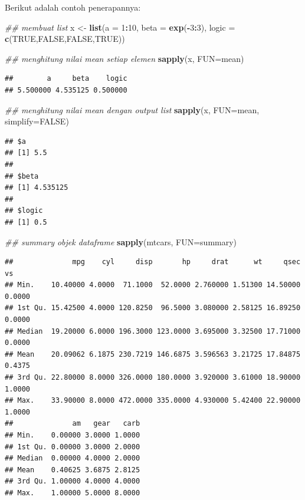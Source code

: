 \documentclass[]{book}
\newenvironment{Shaded}{\begin{snugshade}}{\end{snugshade}}
\newcommand{\CommentTok}[1]{\textcolor[rgb]{0.56,0.35,0.01}{\textit{#1}}}
\newcommand{\DataTypeTok}[1]{\textcolor[rgb]{0.13,0.29,0.53}{#1}}
\newcommand{\DecValTok}[1]{\textcolor[rgb]{0.00,0.00,0.81}{#1}}
\newcommand{\KeywordTok}[1]{\textcolor[rgb]{0.13,0.29,0.53}{\textbf{#1}}}
\newcommand{\NormalTok}[1]{#1}
\newcommand{\OperatorTok}[1]{\textcolor[rgb]{0.81,0.36,0.00}{\textbf{#1}}}
\newcommand{\OtherTok}[1]{\textcolor[rgb]{0.56,0.35,0.01}{#1}}
\newcommand{\StringTok}[1]{\textcolor[rgb]{0.31,0.60,0.02}{#1}}
\theoremstyle{definition}
\theoremstyle{definition}
\theoremstyle{definition}
\theoremstyle{remark}
\begin{document}
Berikut adalah contoh penerapannya:

\begin{Shaded}
\begin{Highlighting}[]
\CommentTok{## membuat list}
\NormalTok{x <-}\StringTok{ }\KeywordTok{list}\NormalTok{(}\DataTypeTok{a =} \DecValTok{1}\OperatorTok{:}\DecValTok{10}\NormalTok{, }\DataTypeTok{beta =} \KeywordTok{exp}\NormalTok{(}\OperatorTok{-}\DecValTok{3}\OperatorTok{:}\DecValTok{3}\NormalTok{), }\DataTypeTok{logic =} \KeywordTok{c}\NormalTok{(}\OtherTok{TRUE}\NormalTok{,}\OtherTok{FALSE}\NormalTok{,}\OtherTok{FALSE}\NormalTok{,}\OtherTok{TRUE}\NormalTok{))}

\CommentTok{## menghitung nilai mean setiap elemen}
\KeywordTok{sapply}\NormalTok{(x, }\DataTypeTok{FUN=}\NormalTok{mean)}
\end{Highlighting}
\end{Shaded}

\begin{verbatim}
##        a     beta    logic 
## 5.500000 4.535125 0.500000
\end{verbatim}

\begin{Shaded}
\begin{Highlighting}[]
\CommentTok{## menghitung nilai mean dengan output list}
\KeywordTok{sapply}\NormalTok{(x, }\DataTypeTok{FUN=}\NormalTok{mean, }\DataTypeTok{simplify=}\OtherTok{FALSE}\NormalTok{)}
\end{Highlighting}
\end{Shaded}

\begin{verbatim}
## $a
## [1] 5.5
## 
## $beta
## [1] 4.535125
## 
## $logic
## [1] 0.5
\end{verbatim}

\begin{Shaded}
\begin{Highlighting}[]
\CommentTok{## summary objek dataframe}
\KeywordTok{sapply}\NormalTok{(mtcars, }\DataTypeTok{FUN=}\NormalTok{summary)}
\end{Highlighting}
\end{Shaded}

\begin{verbatim}
##              mpg    cyl     disp       hp     drat      wt     qsec     vs
## Min.    10.40000 4.0000  71.1000  52.0000 2.760000 1.51300 14.50000 0.0000
## 1st Qu. 15.42500 4.0000 120.8250  96.5000 3.080000 2.58125 16.89250 0.0000
## Median  19.20000 6.0000 196.3000 123.0000 3.695000 3.32500 17.71000 0.0000
## Mean    20.09062 6.1875 230.7219 146.6875 3.596563 3.21725 17.84875 0.4375
## 3rd Qu. 22.80000 8.0000 326.0000 180.0000 3.920000 3.61000 18.90000 1.0000
## Max.    33.90000 8.0000 472.0000 335.0000 4.930000 5.42400 22.90000 1.0000
##              am   gear   carb
## Min.    0.00000 3.0000 1.0000
## 1st Qu. 0.00000 3.0000 2.0000
## Median  0.00000 4.0000 2.0000
## Mean    0.40625 3.6875 2.8125
## 3rd Qu. 1.00000 4.0000 4.0000
## Max.    1.00000 5.0000 8.0000
\end{verbatim}
\end{document}
